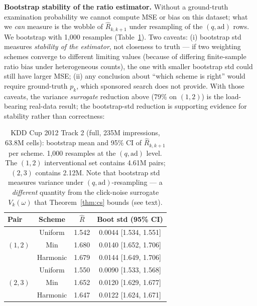 \documentclass[sigconf]{acmart}
\begin{document}
\textbf{Bootstrap stability of the ratio estimator.}
Without a ground-truth examination probability we cannot compute MSE or bias on
this dataset; what we \emph{can} measure is the wobble of $\hat{R}_{k,k+1}$
under resampling of the $(q,\mathrm{ad})$ rows. We bootstrap with 1{,}000
resamples (Table~\ref{tab:kdd2012}). Two caveats: (i) bootstrap std measures
\emph{stability of the estimator}, not closeness to truth — if two weighting
schemes converge to different limiting values (because of differing
finite-sample ratio bias under heterogeneous counts), the one with smaller
bootstrap std could still have larger MSE; (ii) any conclusion about
``which scheme is right'' would require ground-truth $p_k$, which sponsored
search does not provide. With those caveats, the variance \emph{surrogate}
reduction above (79\% on $(1,2)$) is the load-bearing real-data result; the
bootstrap-std reduction is supporting evidence for stability rather than
correctness:

\begin{table}[h]
\small
\centering
\caption{KDD Cup 2012 Track 2 (full, 235M impressions, 63.8M cells): bootstrap
mean and 95\% CI of $\hat{R}_{k,k+1}$ per scheme. 1{,}000 resamples at the
$(q,\mathrm{ad})$ level. The $(1,2)$ interventional set contains 4.61M pairs;
$(2,3)$ contains 2.12M. Note that bootstrap std measures variance under
$(q,\mathrm{ad})$-resampling --- a \emph{different} quantity from the
click-noise surrogate $V_k(\omega)$ that Theorem~\ref{thm:cs} bounds (see text).}
\label{tab:kdd2012}
\begin{tabular}{lccc}
\toprule
Pair & Scheme & $\hat{R}$ & Boot std (95\% CI) \\
\midrule
\multirow{3}{*}{$(1,2)$} & Uniform  & 1.542 & 0.0044 \footnotesize{[1.534, 1.551]} \\
                          & Min      & 1.680 & 0.0140 \footnotesize{[1.652, 1.706]} \\
                          & Harmonic & 1.679 & 0.0144 \footnotesize{[1.649, 1.706]} \\
\midrule
\multirow{3}{*}{$(2,3)$} & Uniform  & 1.550 & 0.0090 \footnotesize{[1.533, 1.568]} \\
                          & Min      & 1.652 & 0.0120 \footnotesize{[1.629, 1.677]} \\
                          & Harmonic & 1.647 & 0.0122 \footnotesize{[1.624, 1.671]} \\
\bottomrule
\end{tabular}
\end{table}
\end{document}
